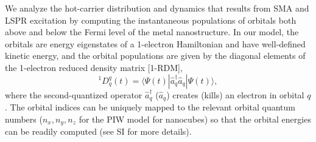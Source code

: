 \documentclass[journal=jpclcd,manuscript=letter]{achemso}
\begin{document}
We analyze the hot-carrier distribution and dynamics that results from SMA and LSPR excitation by computing the 
instantaneous populations of orbitals both above and below the Fermi level of the metal nanostructure.   
In our model, the orbitals are energy eigenstates of a 1-electron Hamiltonian and have well-defined kinetic energy,
and the orbital populations are given by the diagonal elements of the 1-electron reduced density matrix [1-RDM],
\begin{equation}
^1D^q_q(t) = \langle \Psi(t) | \hat{a}^{\dagger}_q \hat{a}_q | \Psi(t) \rangle,
\end{equation} 
where the second-quantized operator $\hat{a}_q^{\dagger}$ ($\hat{a}_q$) creates (kills) an electron
in orbital $q$.  The orbital indices can be uniquely mapped to the relevant orbital quantum numbers ($n_x, n_y, n_z$ for
the PIW model for nanocubes) so that the orbital energies can be readily computed (see SI for more details). 
\end{document}
